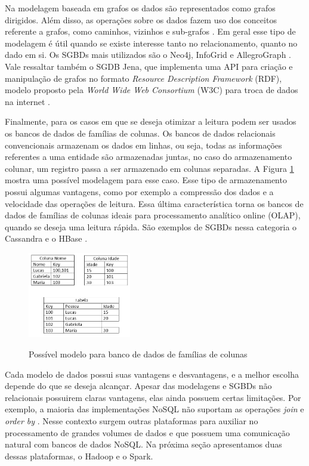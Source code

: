 Na modelagem baseada em grafos os dados são representados como grafos dirigidos. Além disso, 
as operações sobre os dados fazem uso dos conceitos referente a grafos, como caminhos, 
vizinhos e sub-grafos \cite{de2010nosql}. Em geral esse tipo de modelagem é útil 
quando se existe interesse tanto no relacionamento, quanto no dado em si. Os SGBDs mais 
utilizados são o Neo4j, InfoGrid e AllegroGraph \cite{moniruzzaman2013nosql}. Vale ressaltar 
também o SGDB Jena, que implementa uma API para criação e manipulação de grafos no formato 
\textit{Resource Description Framework} (RDF), modelo proposto pela \textit{World Wide Web 
Consortium} (W3C) para troca de dados na internet \cite{mcbride2001jena}.

Finalmente, para os casos em que se deseja otimizar a leitura podem ser usados os bancos de 
dados de famílias de colunas. Os bancos de dados relacionais convencionais armazenam os dados 
em linhas, ou seja, todas as informações referentes a uma entidade são armazenadas juntas, 
no caso do armazenamento colunar, um registro passa a ser armazenado em colunas separadas. 
A Figura \ref{fig:db-colunar} mostra uma possível modelagem para esse caso. Esse tipo de 
armazenamento possui algumas vantagens, como por exemplo a compressão dos dados e a 
velocidade das operações de leitura. Essa última característica torna os bancos de dados de 
famílias de colunas ideais para processamento analítico online (OLAP), quando se deseja uma 
leitura rápida. São exemplos de SGBDs nessa categoria o Cassandra e o HBase \cite{de2010nosql}.

\begin{figure}[!htb]
    \centering
    \caption{Possível modelo para banco de dados de famílias de colunas}
    \includegraphics[width=0.4\textwidth]{./04-figuras/db-colunar}
    \label{fig:db-colunar}
\end{figure}


Cada modelo de dados possui suas vantagens e desvantagens, e a melhor escolha depende do que 
se deseja alcançar. Apesar das modelagens e SGBDs não relacionais possuirem claras vantagens,  
elas ainda possuem certas limitações. Por exemplo, a maioria das implementações NoSQL não
suportam as operações \textit{join} e \textit{order by} \cite{pokorny2013nosql}. 
Nesse contexto surgem outras plataformas para auxiliar no processamento de grandes volumes 
de dados e que possuem uma comunicação natural com bancos de dados NoSQL. Na próxima seção 
apresentamos duas dessas plataformas, o Hadoop e o Spark.

